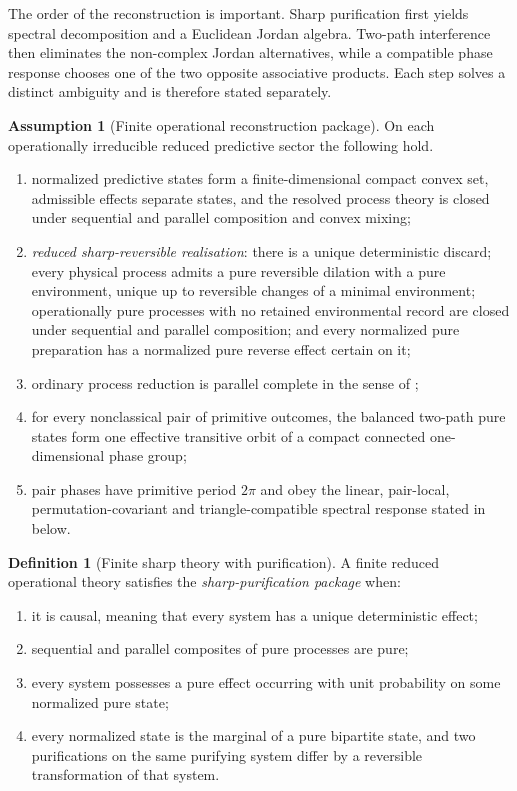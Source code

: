 \documentclass[11pt]{article}
\theoremstyle{definition}
\newtheorem{definition}[theorem]{Definition}
\newtheorem{assumption}{Assumption}[section]
\theoremstyle{remark}
\begin{document}
The order of the reconstruction is important.  Sharp purification first yields
spectral decomposition and a Euclidean Jordan algebra.  Two-path interference
then eliminates the non-complex Jordan alternatives, while a compatible phase
response chooses one of the two opposite associative products.  Each step solves
a distinct ambiguity and is therefore stated separately.

\begin{assumption}[Finite operational reconstruction package]
\label{ass:reconstruction-package}
On each operationally irreducible reduced predictive sector the following hold.
\begin{enumerate}[label=\textup{(O\arabic*)},leftmargin=3em]
\item normalized predictive states form a finite-dimensional compact convex set,
      admissible effects separate states, and the resolved process theory is
      closed under sequential and parallel composition and convex mixing;
\item \emph{reduced sharp-reversible realisation}: there is a unique deterministic
      discard; every physical process admits a pure reversible dilation with a
      pure environment, unique up to reversible changes of a minimal environment;
      operationally pure processes with no retained environmental record are
      closed under sequential and parallel composition; and every normalized
      pure preparation has a normalized pure reverse effect certain on it;
\item ordinary process reduction is parallel complete in the sense of
      ;
\item for every nonclassical pair of primitive outcomes, the balanced two-path
      pure states form one effective transitive orbit of a compact connected
      one-dimensional phase group;
\item pair phases have primitive period $2\pi$ and obey the linear, pair-local,
      permutation-covariant and triangle-compatible spectral response stated in
       below.
\end{enumerate}
\end{assumption}

\begin{definition}[Finite sharp theory with purification]
\label{def:sharp-purification}
A finite reduced operational theory satisfies the \emph{sharp-purification
package} when:
\begin{enumerate}[label=\textup{(SP\arabic*)},leftmargin=3em]
\item it is causal, meaning that every system has a unique deterministic effect;
\item sequential and parallel composites of pure processes are pure;
\item every system possesses a pure effect occurring with unit probability on
      some normalized pure state;
\item every normalized state is the marginal of a pure bipartite state, and two
      purifications on the same purifying system differ by a reversible
      transformation of that system.
\end{enumerate}
\end{definition}
\end{document}
